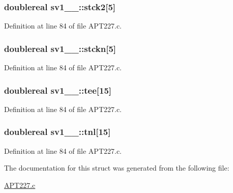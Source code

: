 \subsubsection[{\texorpdfstring{stck2}{stck2}}]{\setlength{\rightskip}{0pt plus 5cm}doublereal sv1\+\_\+\_\+\+::stck2\mbox{[}5\mbox{]}}\hypertarget{structsv1__1___a6b0411c8452c04c7a3ab1f98f6099c71}{}\label{structsv1__1___a6b0411c8452c04c7a3ab1f98f6099c71}


Definition at line 84 of file A\+P\+T227.\+c.

\subsubsection[{\texorpdfstring{stckn}{stckn}}]{\setlength{\rightskip}{0pt plus 5cm}doublereal sv1\+\_\+\_\+\+::stckn\mbox{[}5\mbox{]}}\hypertarget{structsv1__1___afdd9e5ab969d78c0cfaa0dadac262b47}{}\label{structsv1__1___afdd9e5ab969d78c0cfaa0dadac262b47}


Definition at line 84 of file A\+P\+T227.\+c.

\subsubsection[{\texorpdfstring{tee}{tee}}]{\setlength{\rightskip}{0pt plus 5cm}doublereal sv1\+\_\+\_\+\+::tee\mbox{[}15\mbox{]}}\hypertarget{structsv1__1___af3678e9944777202322f3e7b281cd2e2}{}\label{structsv1__1___af3678e9944777202322f3e7b281cd2e2}


Definition at line 84 of file A\+P\+T227.\+c.

\subsubsection[{\texorpdfstring{tnl}{tnl}}]{\setlength{\rightskip}{0pt plus 5cm}doublereal sv1\+\_\+\_\+\+::tnl\mbox{[}15\mbox{]}}\hypertarget{structsv1__1___a89c3c473aa8506badf51b9ee838a903c}{}\label{structsv1__1___a89c3c473aa8506badf51b9ee838a903c}


Definition at line 84 of file A\+P\+T227.\+c.



The documentation for this struct was generated from the following file\+:\begin{DoxyCompactItemize}
\item 
\hyperlink{APT227_8c}{A\+P\+T227.\+c}\end{DoxyCompactItemize}
